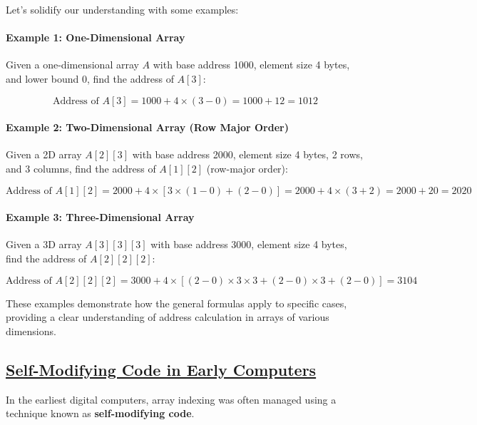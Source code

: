 \documentclass{book}
\begin{document}
Let’s solidify our understanding with some examples:

\paragraph{Example 1: One-Dimensional Array}
Given a one-dimensional array \( A \) with base address 1000, element size 4 bytes, and lower bound 0, find the address of \( A[3] \):

\[
\text{Address of } A[3] = 1000 + 4 \times (3 - 0) = 1000 + 12 = 1012
\]

\paragraph{Example 2: Two-Dimensional Array (Row Major Order)}
Given a 2D array \( A[2][3] \) with base address 2000, element size 4 bytes, 2 rows, and 3 columns, find the address of \( A[1][2] \) (row-major order):

\[
\text{Address of } A[1][2] = 2000 + 4 \times \left[ 3 \times (1 - 0) + (2 - 0) \right] = 2000 + 4 \times (3 + 2) = 2000 + 20 = 2020
\]

\paragraph{Example 3: Three-Dimensional Array}
Given a 3D array \( A[3][3][3] \) with base address 3000, element size 4 bytes, find the address of \( A[2][2][2] \):

\[\text{Address of } A[2][2][2] = 3000 + 4 \times \left[ (2 - 0) \times 3 \times 3 + (2 - 0) \times 3 + (2 - 0) \right] = 3104\]

These examples demonstrate how the general formulas apply to specific cases, providing a clear understanding of address calculation in arrays of various dimensions.


	\subsection{\href{https://en.wikipedia.org/wiki/Self-modifying_code}{Self-Modifying Code in Early Computers}}
	
	In the earliest digital computers, array indexing was often managed using a technique known as \textbf{self-modifying code}.
	
\end{document}
